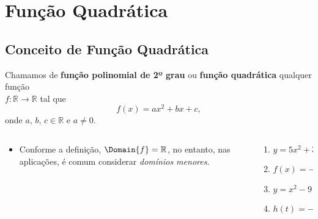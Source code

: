 \section{Função Quadrática}

\subsection{Conceito de Função Quadrática}

\begin{frame}
  \begin{definition}
    Chamamos de \textbf{função polinomial de 2º grau} ou \textbf{função quadrática} qualquer função \\ $f:\mathbb{R}\rightarrow\mathbb{R}$ tal que
    \begin{equation*}
      f(x) = ax^{2} + bx + c,
    \end{equation*}
    onde $a,\,b,\,c\in\mathbb{R}$ e $a\not=0$.
  \end{definition}
  \begin{columns}[onlytextwidth]
    \begin{column}{0.59\textwidth}
      \begin{highlight}
        \begin{itemize}
          \item Conforme a definição, $\Domain{f} = \mathbb{R}$, no entanto,
          nas aplicações, é comum considerar \emph{domínios menores}.
        \end{itemize}
      \end{highlight}
    \end{column}
    \begin{column}{0.39\textwidth}
      \begin{example-highlight}
        \begin{enumerate}
          \item $y = 5x^2 + 3x - 3$
          \item $f(x) = -x^{2} + 7x$
          \item $y = x^{2} - 9$
          \item $h(t) = -t^{2} + 5t - 8$
        \end{enumerate}
      \end{example-highlight}
    \end{column}
  \end{columns}
\end{frame}

